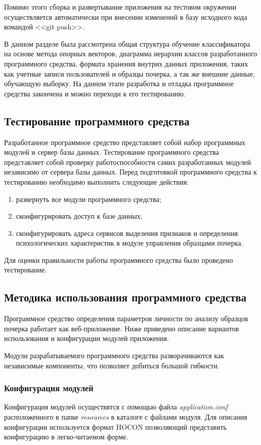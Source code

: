 Помимо этого сборка и развертывание приложения на тестовом окружении осуществляется автоматически при внесении изменений в базу исходного кода командой <<git push>>.

В данном разделе была рассмотрена общая структура обучение классификатора на основе метода опорных векторов, диаграмма иерархии классов разработанного программного средства, формата хранения внутрих данных приложения, таких как учетные записи пользователей и образцы почерка, а так же внешние данные, обучающую выборку. На данном этапе разработка и отладка программное средства закончена и можно переходи к его тестированию.

\subsection{Тестирование программного средства}
\label{sec:testing}
Разработанное программное средство представляет собой набор программных модулей и сервер базы данных. Тестирование программного средства представляет собой проверку работоспособности самих разработанных модулей независимо от сервера базы данных. 
Перед подготовкой программного средства к тестированию необходимо выполнить следующие действия:
\begin{enumerate}
  \item развернуть все модули программного средства;
  \item сконфигурировать доступ к базе данных;
  \item сконфигурировать адреса сервисов выделения признаков и определения психологических характеристик в модуле управления образцами почерка.
\end{enumerate}

Для оценки правильности работы программного средства было проведено тестирование.

\subsection{Методика использования программного средства}
\label{sec:manpage:admin_man}
Программное средство определения параметров личности по анализу образцов почерка работает как веб-приложение. Ниже приведено описание вариантов использования и конфигурации модулей приложения.

Модули разрабатываемого программного средства разворачиваются как независимые компоненты, что позволяет добиться большой гибкости.

\subsubsection{Конфигурация модулей}
Конфигурация модулей осуществятся с помощью файла \emph{application.conf} расположенного в папке \emph{resources} в каталоге с файлами модуля. Для описания конфигурации используется формат HOCON позволяющий представить конфигурацию в легко-читаемом форме. 

